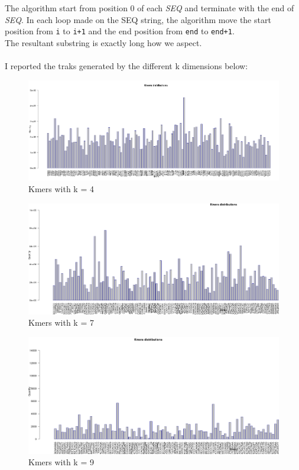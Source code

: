The algorithm start from position 0 of each \emph{SEQ} and terminate with the end of \emph{SEQ}.
In each loop made on the SEQ string, the algorithm move the start position from \verb|i| to \verb|i+1| and the end position from \verb|end| to \verb|end+1|.\\
The resultant substring is exactly long how we aspect.\\\\

I reported the traks generated by the different k dimensions below:

 \begin{figure}[H]
				\centering
				\includegraphics[scale=0.45]{immagini/kmers_4.png}
				\caption{Kmers with k = 4}\label{fig:12}
				\end{figure}


 \begin{figure}[H]
				\centering
				\includegraphics[scale=0.45]{immagini/kmers_7.png}
				\caption{Kmers with k = 7}\label{fig:13}
				\end{figure}
				
				
				
 \begin{figure}[H]
				\centering
				\includegraphics[scale=0.45]{immagini/kmers_9.png}
				\caption{Kmers with k = 9}\label{fig:14}
				\end{figure}	
				
